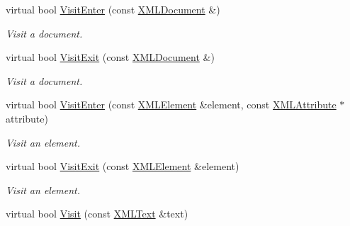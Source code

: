 \begin{DoxyCompactItemize}
\mbox{\label{classtinyxml2_1_1_x_m_l_printer_a9aa1de11a55a07db55a90fde37d7afad}} 
virtual bool \hyperlink{classtinyxml2_1_1_x_m_l_printer_a9aa1de11a55a07db55a90fde37d7afad}{Visit\+Enter} (const \hyperlink{classtinyxml2_1_1_x_m_l_document}{X\+M\+L\+Document} \&)
\begin{DoxyCompactList}\small\item\em Visit a document. \end{DoxyCompactList}\item 
\mbox{\label{classtinyxml2_1_1_x_m_l_printer_a15fc1f2b922f540917dcf52808737b29}} 
virtual bool \hyperlink{classtinyxml2_1_1_x_m_l_printer_a15fc1f2b922f540917dcf52808737b29}{Visit\+Exit} (const \hyperlink{classtinyxml2_1_1_x_m_l_document}{X\+M\+L\+Document} \&)
\begin{DoxyCompactList}\small\item\em Visit a document. \end{DoxyCompactList}\item 
\mbox{\label{classtinyxml2_1_1_x_m_l_printer_a169b2509d8eabb70811b2bb8cfd1f5d1}} 
virtual bool \hyperlink{classtinyxml2_1_1_x_m_l_printer_a169b2509d8eabb70811b2bb8cfd1f5d1}{Visit\+Enter} (const \hyperlink{classtinyxml2_1_1_x_m_l_element}{X\+M\+L\+Element} \&element, const \hyperlink{classtinyxml2_1_1_x_m_l_attribute}{X\+M\+L\+Attribute} $\ast$attribute)
\begin{DoxyCompactList}\small\item\em Visit an element. \end{DoxyCompactList}\item 
\mbox{\label{classtinyxml2_1_1_x_m_l_printer_a2edd48405971a88951c71c9df86a2f50}} 
virtual bool \hyperlink{classtinyxml2_1_1_x_m_l_printer_a2edd48405971a88951c71c9df86a2f50}{Visit\+Exit} (const \hyperlink{classtinyxml2_1_1_x_m_l_element}{X\+M\+L\+Element} \&element)
\begin{DoxyCompactList}\small\item\em Visit an element. \end{DoxyCompactList}\item 
\mbox{\label{classtinyxml2_1_1_x_m_l_printer_adc0e42b4f6fcb90a95630c79575d030b}} 
virtual bool \hyperlink{classtinyxml2_1_1_x_m_l_printer_adc0e42b4f6fcb90a95630c79575d030b}{Visit} (const \hyperlink{classtinyxml2_1_1_x_m_l_text}{X\+M\+L\+Text} \&text)

\end{DoxyCompactItemize}
